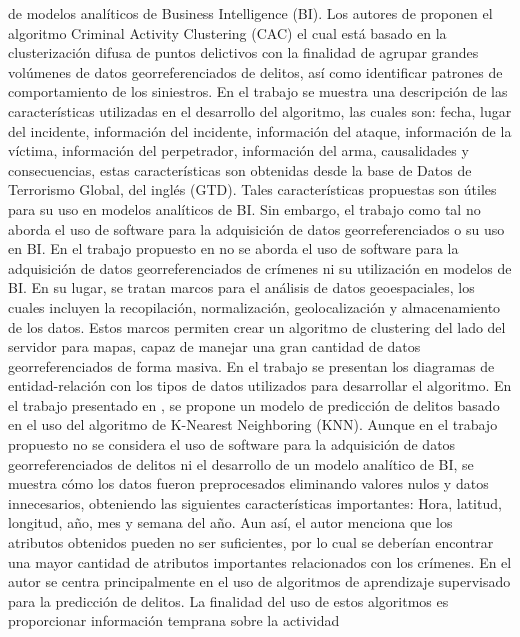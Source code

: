 de modelos analíticos de Business Intelligence (BI).
\bigbreak
Los autores de \cite{winPCPDParallelCrime2019} proponen el algoritmo Criminal Activity Clustering (CAC) el cual está basado
en la clusterización difusa de puntos delictivos con la finalidad de agrupar grandes volúmenes de datos georreferenciados de delitos,
así como identificar patrones de comportamiento de los siniestros. En el trabajo se muestra una descripción de las características
utilizadas en el desarrollo del algoritmo, las cuales son: fecha, lugar del incidente, información del incidente, información del ataque,
información de la víctima, información del perpetrador, información del arma, causalidades y consecuencias, estas características son
obtenidas desde la base de Datos de Terrorismo Global, del inglés (GTD). Tales características propuestas son útiles para su uso en modelos
analíticos de BI. Sin embargo, el trabajo como tal no aborda el uso de software para la adquisición de datos georreferenciados o
su uso en BI.
\bigbreak
En el trabajo propuesto en \cite{amirkhanyanMethodsFrameworksGeoSpatioTemporal2019} no se aborda el uso de software para la
adquisición de datos georreferenciados de crímenes ni su utilización en modelos de BI. En su lugar, se tratan marcos para el
análisis de datos geoespaciales, los cuales incluyen la recopilación, normalización, geolocalización y almacenamiento de los datos.
Estos marcos permiten crear un algoritmo de clustering del lado del servidor para mapas, capaz de manejar una gran cantidad de datos
georreferenciados de forma masiva. En el trabajo se presentan los diagramas de entidad-relación con los tipos de datos utilizados
para desarrollar el algoritmo.
\bigbreak
En el trabajo presentado en \cite{kumarCrimePredictionUsing2020}, se propone un modelo de predicción de delitos basado en el uso
del algoritmo de K-Nearest Neighboring (KNN). Aunque en el trabajo propuesto no se considera el uso de software para la adquisición de datos
georreferenciados de delitos ni el desarrollo de un modelo analítico de BI, se muestra cómo los datos fueron preprocesados eliminando
valores nulos y datos innecesarios, obteniendo las siguientes características importantes: Hora, latitud, longitud, año, mes y semana del año.
Aun así, el autor menciona que los atributos obtenidos pueden no ser suficientes, por lo cual se deberían encontrar una mayor cantidad
de atributos importantes relacionados con los crímenes.
\bigbreak
En \cite{hossainCrimePredictionUsing2020} el autor se centra principalmente en el uso de algoritmos de aprendizaje supervisado
para la predicción de delitos. La finalidad del uso de estos algoritmos es proporcionar información temprana sobre la actividad
